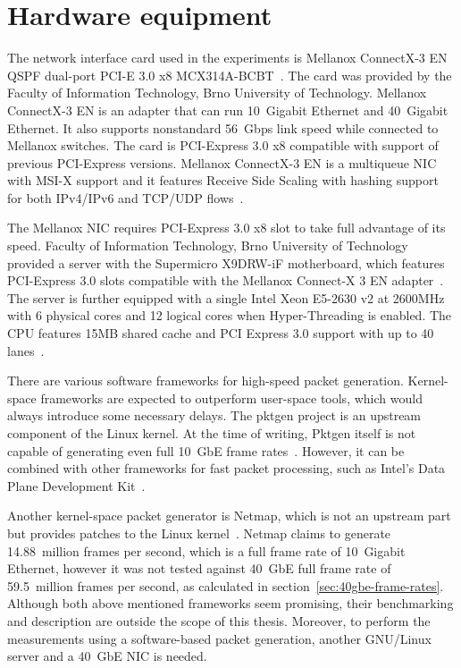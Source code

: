 
\section{Hardware equipment}\label{sec:analysis-hardware}
The network interface card used in the experiments is
Mellanox ConnectX-3 EN QSPF dual-port PCI-E 3.0 x8 MCX314A-BCBT~\cite{mellanox-product-brief}.
The card was provided by the Faculty of Information Technology, Brno University of Technology.
Mellanox ConnectX-3 EN is an adapter that can run 10~Gigabit Ethernet and 40~Gigabit Ethernet.
It also supports nonstandard 56~Gbps link speed while connected to Mellanox switches.
The card is PCI-Express 3.0 x8 compatible with support of previous PCI-Express versions.
Mellanox ConnectX-3 EN is a multiqueue NIC with MSI-X support %
and it features Receive Side Scaling with hashing support for both IPv4/IPv6 and TCP/UDP flows~\cite{mellanox-user-manual}.

The Mellanox NIC requires PCI-Express 3.0 x8 slot to take full advantage of its speed.
Faculty of Information Technology, Brno University of Technology provided a server with
the Supermicro X9DRW-iF motherboard, which
features PCI-Express 3.0 slots compatible with the Mellanox Connect-X 3 EN adapter~\cite{supermicro-board}.
The server is further equipped with a single Intel Xeon E5-2630 v2 at 2600MHz with 6 physical cores
and 12 logical cores when Hyper-Threading is enabled.
The CPU features 15MB shared cache and PCI Express 3.0 support with up to 40 lanes~\cite{intel-xeon-cpu}.

There are various software frameworks for high-speed packet generation.
Kernel-space frameworks are expected to outperform user-space tools, which would always introduce some necessary delays.
The pktgen project is an upstream component of the Linux kernel.
At the time of writing, Pktgen itself is not capable of generating even full 10~GbE frame rates~\cite{netmap}.
However, it can be combined with other frameworks for fast packet processing, such as
Intel's Data Plane Development Kit~\cite{dpdk}.

Another kernel-space packet generator is Netmap,
which is not an upstream part but provides patches to the Linux kernel~\cite{netmap}.
Netmap claims to generate 14.88~million frames per second, which is a full frame rate of 10~Gigabit Ethernet,
however it was not tested against 40~GbE full frame rate of 59.5~million frames per second,
as calculated in section~\ref{sec:40gbe-frame-rates}.
Although both above mentioned frameworks seem promising, their benchmarking and description
are outside the scope of this thesis.
Moreover, to perform the measurements using a software-based packet generation,
another GNU/Linux server and a 40~GbE NIC is needed.

